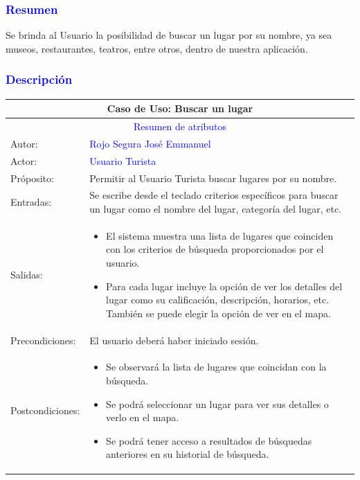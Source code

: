 \subsubsection{\textcolor{blue}{Resumen}}
Se brinda al Usuario la posibilidad de buscar un lugar por su nombre, ya sea museos, restaurantes, teatros, entre otros, dentro de nuestra aplicación.

\subsubsection{\textcolor{blue}{Descripción}}
\begin{tabularx}{16cm}{||l|X||}
	\hline
	\multicolumn{2}{||c||}{Caso de Uso: Buscar un lugar } \\
	\hline
	\multicolumn{2}{||c||}{\textcolor{blue}{Resumen de atributos}} \\
         \hline
	{Autor:} & {\textcolor{blue}{Rojo Segura José Emmanuel}} \\
	\hline
	\hline
	{Actor:} & {\textcolor{blue}{Usuario Turista}} \\
	\hline
	{Próposito:} & {Permitir al Usuario Turista buscar lugares por su nombre.} \\
	\hline
	{Entradas:} &  Se escribe desde el teclado criterios específicos para buscar un lugar como el nombre del lugar, categoría del lugar, etc.\\
	\hline
	{Salidas:} & 
        \begin{itemize}
        \item El sistema muestra una lista de lugares que coinciden con los criterios de búsqueda proporcionados por el usuario.
        \item Para cada lugar incluye la opción de ver los detalles del lugar como su calificación, descripción, horarios, etc. También se puede elegir la opción de ver en el mapa.
        \end{itemize} \\
	\hline
	{Precondiciones:} & El usuario deberá haber iniciado sesión.\\ 
	\hline
	{Postcondiciones:} & 
         \begin{itemize}
            \item Se observará la lista de lugares que coincidan con la búsqueda.
            \item Se podrá seleccionar un lugar para ver sus detalles o verlo en el mapa.
            \item Se podrá tener acceso a resultados de búsquedas anteriores en su historial de búsqueda.

\end{itemize}
\end{tabularx}
